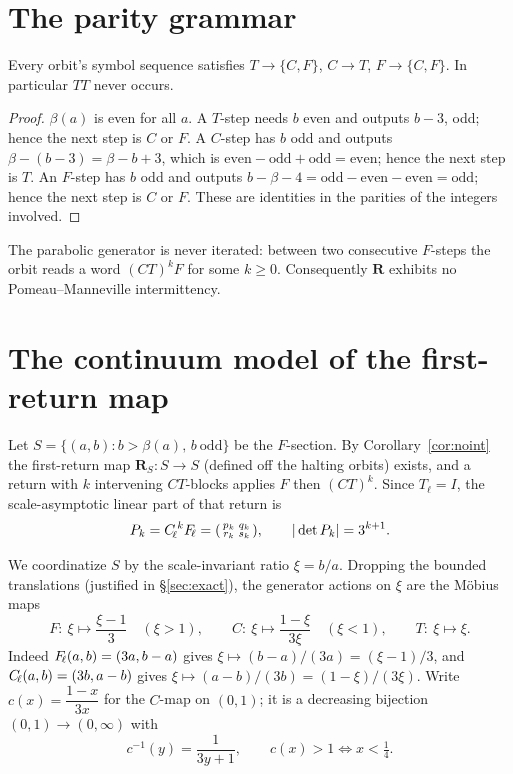 \documentclass[11pt]{article}
\theoremstyle{definition}\newtheorem{definition}{Definition}
\theoremstyle{remark}\newtheorem{remark}{Remark}
\newcommand{\R}{\mathbf{R}}\newcommand{\Z}{\mathbb{Z}}\newcommand{\N}{\mathbb{N}}
\begin{document}
\section{The parity grammar}
\begin{lemma}\label{lem:grammar}
Every orbit's symbol sequence satisfies $T\!\to\!\{C,F\}$, $C\!\to\!T$,
$F\!\to\!\{C,F\}$. In particular $TT$ never occurs.
\end{lemma}
\begin{proof}
$\beta(a)$ is even for all $a$. A $T$-step needs $b$ even and outputs
$b-3$, odd; hence the next step is $C$ or $F$. A $C$-step has $b$ odd and
outputs $\beta-(b-3)=\beta-b+3$, which is $\text{even}-\text{odd}+\text{odd}
=\text{even}$; hence the next step is $T$. An $F$-step has $b$ odd and
outputs $b-\beta-4=\text{odd}-\text{even}-\text{even}=\text{odd}$; hence the
next step is $C$ or $F$. These are identities in the parities of the
integers involved.
\end{proof}

\begin{corollary}\label{cor:noint}
The parabolic generator is never iterated: between two consecutive
$F$-steps the orbit reads a word $(CT)^kF$ for some $k\ge0$. Consequently
$\R$ exhibits no Pomeau--Manneville intermittency.
\end{corollary}

\section{The continuum model of the first-return map}\label{sec:model}
Let $S=\{(a,b):b>\beta(a),\,b\ \mathrm{odd}\}$ be the $F$-section. By
Corollary~\ref{cor:noint} the first-return map $\R_S:S\to S$ (defined off
the halting orbits) exists, and a return with $k$ intervening $CT$-blocks
applies $F$ then $(CT)^k$. Since $T_{\!\ell}=I$, the scale-asymptotic
linear part of that return is
\begin{equation}\label{eq:Pk}
P_k=C_{\!\ell}^{\,k}F_{\!\ell}=\begin{psmallmatrix}p_k&q_k\\ r_k&s_k\end{psmallmatrix},\qquad
|\det P_k|=3^{k+1}.
\end{equation}

We coordinatize $S$ by the scale-invariant ratio $\xi=b/a$. Dropping the
bounded translations (justified in \S\ref{sec:exact}), the generator
actions on $\xi$ are the M\"obius maps
\begin{equation}\label{eq:xi}
F:\ \xi\mapsto \frac{\xi-1}{3}\quad(\xi>1),\qquad
C:\ \xi\mapsto\frac{1-\xi}{3\xi}\quad(\xi<1),\qquad T:\ \xi\mapsto\xi.
\end{equation}
Indeed $F_{\!\ell}(a,b)=(3a,b-a)$ gives $\xi\mapsto(b-a)/(3a)=(\xi-1)/3$,
and $C_{\!\ell}(a,b)=(3b,a-b)$ gives $\xi\mapsto(a-b)/(3b)=(1-\xi)/(3\xi)$.
Write $c(x)=\dfrac{1-x}{3x}$ for the $C$-map on $(0,1)$; it is a decreasing
bijection $(0,1)\to(0,\infty)$ with
\begin{equation}\label{eq:cinv}
c^{-1}(y)=\frac{1}{3y+1},\qquad c(x)>1\iff x<\tfrac14 .
\end{equation}
\end{document}
